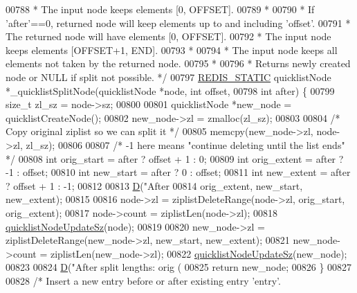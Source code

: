 \begin{DoxyCode}
{{00788 \textcolor{comment}{ *                The input node keeps elements [0, OFFSET].}
00789 \textcolor{comment}{ *}
00790 \textcolor{comment}{ * If 'after'==0, returned node will keep elements up to and including 'offset'.}
00791 \textcolor{comment}{ *                The returned node will have elements [0, OFFSET].}
00792 \textcolor{comment}{ *                The input node keeps elements [OFFSET+1, END].}
00793 \textcolor{comment}{ *}
00794 \textcolor{comment}{ * The input node keeps all elements not taken by the returned node.}
00795 \textcolor{comment}{ *}
00796 \textcolor{comment}{ * Returns newly created node or NULL if split not possible. */}
00797 \hyperlink{quicklist_8c_a9c22c9c899458021930a552a4f94d317}{REDIS\_STATIC} quicklistNode *\_quicklistSplitNode(quicklistNode *node, \textcolor{keywordtype}{int} offset,
00798                                                 \textcolor{keywordtype}{int} after) \{
00799     size\_t zl\_sz = node->sz;
00800 
00801     quicklistNode *new\_node = quicklistCreateNode();
00802     new\_node->zl = zmalloc(zl\_sz);
00803 
00804     \textcolor{comment}{/* Copy original ziplist so we can split it */}
00805     memcpy(new\_node->zl, node->zl, zl\_sz);
00806 
00807     \textcolor{comment}{/* -1 here means "continue deleting until the list ends" */}
00808     \textcolor{keywordtype}{int} orig\_start = after ? offset + 1 : 0;
00809     \textcolor{keywordtype}{int} orig\_extent = after ? -1 : offset;
00810     \textcolor{keywordtype}{int} new\_start = after ? 0 : offset;
00811     \textcolor{keywordtype}{int} new\_extent = after ? offset + 1 : -1;
00812 
00813     \hyperlink{debugmacro_8h_a74021f021dcdfbb22891787b79c5529d}{D}(\textcolor{stringliteral}{"After %
00814       orig\_extent, new\_start, new\_extent);
00815 
00816     node->zl = ziplistDeleteRange(node->zl, orig\_start, orig\_extent);
00817     node->count = ziplistLen(node->zl);
00818     \hyperlink{quicklist_8c_a03a3947a9423d234923343702619c553}{quicklistNodeUpdateSz}(node);
00819 
00820     new\_node->zl = ziplistDeleteRange(new\_node->zl, new\_start, new\_extent);
00821     new\_node->count = ziplistLen(new\_node->zl);
00822     \hyperlink{quicklist_8c_a03a3947a9423d234923343702619c553}{quicklistNodeUpdateSz}(new\_node);
00823 
00824     \hyperlink{debugmacro_8h_a74021f021dcdfbb22891787b79c5529d}{D}(\textcolor{stringliteral}{"After split lengths: orig (%
00825     \textcolor{keywordflow}{return} new\_node;
00826 \}
00827 
00828 \textcolor{comment}{/* Insert a new entry before or after existing entry 'entry'.}
}}}}
\end{DoxyCode}
